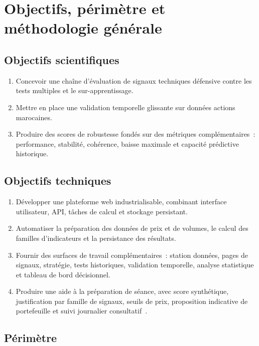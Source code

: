 \section{Objectifs, périmètre et méthodologie générale}
\label{sec:objectifs}

\subsection{Objectifs scientifiques}

\begin{enumerate}
    \item Concevoir une chaîne d'évaluation de signaux techniques défensive contre les
    tests multiples et le sur-apprentissage.
    \item Mettre en place une validation temporelle glissante sur données actions marocaines.
    \item Produire des scores de robustesse fondés sur des métriques complémentaires~:
    performance, stabilité, cohérence, baisse maximale et capacité prédictive historique.
\end{enumerate}

\subsection{Objectifs techniques}

\begin{enumerate}
    \item Développer une plateforme web industrialisable, combinant interface utilisateur,
    API, tâches de calcul et stockage persistant.
    \item Automatiser la préparation des données de prix et de volumes, le calcul des familles
    d'indicateurs et la persistance des résultats.
    \item Fournir des surfaces de travail complémentaires~: station données, pages de
    signaux, stratégie, tests historiques, validation temporelle, analyse statistique
    et tableau de bord décisionnel.
    \item Produire une aide à la préparation de séance, avec score synthétique,
    justification par famille de signaux, seuils de prix, proposition indicative de
    portefeuille et suivi journalier consultatif~\cite{repo_app_map,repo_dashboard_docs}.
\end{enumerate}

\subsection{Périmètre}

